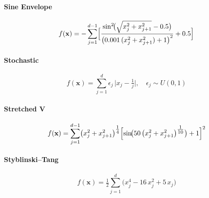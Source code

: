 \vspace{.095em}
\paragraph{Sine Envelope}
\begin{equation}
f(\mathbf{x})
= -\sum_{j=1}^{d-1}\Bigl[
    \frac{\sin^2\!\bigl(\sqrt{x_j^2 + x_{j+1}^2} - 0.5\bigr)}
         {\bigl(0.001\,(x_j^2 + x_{j+1}^2) + 1\bigr)^2}
    + 0.5
  \Bigr]
\label{ben:SineEnvelope}
\end{equation}

\vspace{.095em}
\paragraph{Stochastic}
\begin{equation}
f(\mathbf{x})
= \sum_{j=1}^{d} \epsilon_j \,\bigl\lvert x_j - \tfrac{1}{j}\bigr\rvert,
\quad \epsilon_j \sim U(0,1)
\label{ben:Stochastic}
\end{equation}

\vspace{.095em}
\paragraph{Stretched V}
\begin{equation}
f(\mathbf{x})
= \sum_{j=1}^{d-1}
  \bigl(x_j^2 + x_{j+1}^2\bigr)^{\tfrac14}
  \Bigl[\sin\!\bigl(50\,\bigl(x_j^2 + x_{j+1}^2\bigr)^{\tfrac1{10}}\bigr) + 1\Bigr]^2
\label{ben:StretchedV}
\end{equation}


\vspace{.095em}
\paragraph{Styblinski–Tang}
\begin{equation}
f(\mathbf{x})
= \tfrac12 \sum_{j=1}^{d}\bigl(x_j^4 - 16\,x_j^2 + 5\,x_j\bigr)
\label{ben:StyblinskiTang}
\end{equation}


















